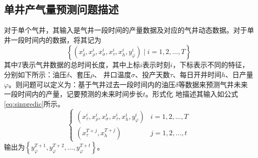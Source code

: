 \subsection{单井产气量预测问题描述}
对于单个气井，其输入是气井一段时间的产量数据及对应的气井动态数据。对于单井一段时间内的数据，将其记为
\begin{equation}
    \left\{ (x_{\delta}^i, x_{\rho}^i, x_{\sigma}^i, x_{\tau}^i, x_{h}^i, y^i_{\varphi }) \mid i = 1, 2, \ldots, T \right\}
    \label{eq:singlewell}
\end{equation}
其中\( T \)表示气井数据的总时间长度，其中上标$i$表示时刻$i$，下标表示不同的特征，分别如下所示：油压\( \delta \)、套压\( \rho \)、
井口温度\( \sigma \)、投产天数\( \tau \)、每日开井时间$h$、日产量$\varphi $。则问题可以定义为：基于气井过去一段时间内的油压\( \delta \)等数据来预测气井未来一段时间内的产量，记要预测的未来时间步长$t$。形式化
地描述其输入如公式\eqref{eq:sinpredic}所示。
\begin{equation}
    \left\{
    \begin{array}{ll}
    (x_{\tau}^i, x_{\rho}^i, x_{\sigma}^i, x_{\tau}^i, x_{h}^i, y_{\varphi }^i) &  i = 1, 2, ..., T \\
    (x_{\tau}^{T+j}, x_{h}^{T+j}) & j = 1, 2, ..., t
    \end{array}
    \right.
    \label{eq:sinpredic}
\end{equation}    
输出为$\left\{ y^{T+1}_{\varphi}, y^{T+2}_{\varphi}, \ldots, y^{T+t}_{\varphi} \right\}$。

